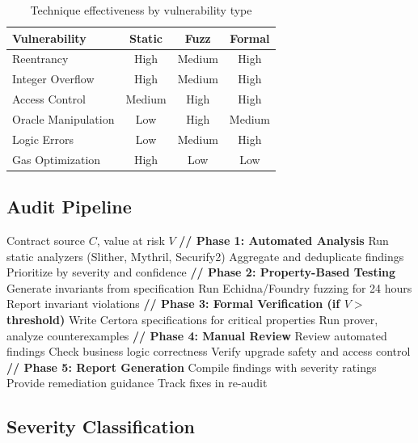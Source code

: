 \documentclass[11pt,a4paper]{article}
\theoremstyle{definition}
\begin{document}
\begin{table}[h]
\centering
\begin{tabular}{lccc}
\toprule
\textbf{Vulnerability} & \textbf{Static} & \textbf{Fuzz} & \textbf{Formal} \\
\midrule
Reentrancy & High & Medium & High \\
Integer Overflow & High & Medium & High \\
Access Control & Medium & High & High \\
Oracle Manipulation & Low & High & Medium \\
Logic Errors & Low & Medium & High \\
Gas Optimization & High & Low & Low \\
\bottomrule
\end{tabular}
\caption{Technique effectiveness by vulnerability type}
\end{table}

\subsection{Audit Pipeline}

\begin{algorithm}
\caption{Integrated Audit Pipeline}
\begin{algorithmic}[1]
\Require Contract source $C$, value at risk $V$
\Statex
\State \textbf{// Phase 1: Automated Analysis}
\State Run static analyzers (Slither, Mythril, Securify2)
\State Aggregate and deduplicate findings
\State Prioritize by severity and confidence
\Statex
\State \textbf{// Phase 2: Property-Based Testing}
\State Generate invariants from specification
\State Run Echidna/Foundry fuzzing for 24 hours
\State Report invariant violations
\Statex
\State \textbf{// Phase 3: Formal Verification (if $V >$ threshold)}
\State Write Certora specifications for critical properties
\State Run prover, analyze counterexamples
\Statex
\State \textbf{// Phase 4: Manual Review}
\State Review automated findings
\State Check business logic correctness
\State Verify upgrade safety and access control
\Statex
\State \textbf{// Phase 5: Report Generation}
\State Compile findings with severity ratings
\State Provide remediation guidance
\State Track fixes in re-audit
\end{algorithmic}
\end{algorithm}

\subsection{Severity Classification}
\end{document}
